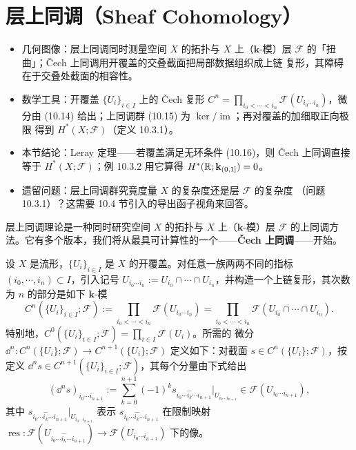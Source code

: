\section{层上同调（Sheaf Cohomology）}

\begin{keytakeaways}
\begin{itemize}
  \item 几何图像：层上同调同时测量空间 $X$ 的拓扑与 $X$ 上（$\mathbf{k}$-模）层
        $\mathcal F$ 的「扭曲」；Čech 上同调用开覆盖的交叠截面把局部数据组织成上链
        复形，其障碍在于交叠处截面的相容性。
  \item 数学工具：开覆盖 $\{U_i\}_{i\in I}$ 上的 Čech 复形
        $C^n=\prod_{i_0<\cdots<i_n}\mathcal F(U_{i_0\cdots i_n})$，微分由 (10.14)
        给出；上同调群 (10.15) 为 $\ker/\operatorname{im}$；再对覆盖的加细取正向极限
        得到 $H^*(X;\mathcal F)$（定义 10.3.1）。
  \item 本节结论：Leray 定理——若覆盖满足无环条件 (10.16)，则 Čech 上同调直接等于
        $H^*(X;\mathcal F)$；例 10.3.2 用它算得 $H^*(\mathbb{R};\mathbf{k}_{(0,1]})=0$。
  \item 遗留问题：层上同调群究竟度量 $X$ 的复杂度还是层 $\mathcal F$ 的复杂度
        （问题 10.3.1）？这需要 10.4 节引入的导出函子视角来回答。
\end{itemize}
\end{keytakeaways}

层上同调理论是一种同时研究空间 $X$ 的拓扑与 $X$ 上（$\mathbf{k}$-模）层
$\mathcal F$ 的上同调方法。它有多个版本，我们将从最具可计算性的一个——\textbf{Čech
上同调}——开始。

设 $X$ 是流形，$\{U_i\}_{i\in I}$ 是 $X$ 的开覆盖。对任意一族两两不同的指标
$(i_0,\cdots,i_n)\subset I$，引入记号
$U_{i_0\cdots i_n}:=U_{i_0}\cap\cdots\cap U_{i_n}$，并构造一个上链复形，其次数为 $n$
的部分是如下 $\mathbf{k}$-模
\begin{equation}\tag{10.13}
C^n(\{U_i\}_{i\in I};\mathcal F):=
\prod_{i_0<\cdots<i_n}\mathcal F(U_{i_0\cdots i_n})
=\prod_{i_0<\cdots<i_n}\mathcal F(U_{i_0}\cap\cdots\cap U_{i_n}).
\end{equation}
特别地，$C^0(\{U_i\}_{i\in I};\mathcal F)=\prod_{i\in I}\mathcal F(U_i)$。所需的
微分 $\dd^n:C^n(\{U_i\};\mathcal F)\to C^{n+1}(\{U_i\};\mathcal F)$ 定义如下：对截面
$s\in C^n(\{U_i\};\mathcal F)$，按定义
$\dd^n s\in C^{n+1}(\{U_i\}_{i\in I};\mathcal F)$，其每个分量由下式给出
\begin{equation}\tag{10.14}
(\dd^n s)_{i_0\cdots i_{n+1}}:=
\sum_{k=0}^{n+1}(-1)^k
s_{i_0\cdots\widehat{i_k}\cdots i_{n+1}}\big|_{U_{i_0\cdots i_{n+1}}}
\in\mathcal F(U_{i_0\cdots i_{n+1}}),
\end{equation}
其中
$s_{i_0\cdots\widehat{i_k}\cdots i_{n+1}}|_{U_{i_0\cdots i_{n+1}}}$ 表示
$s_{i_0\cdots\widehat{i_k}\cdots i_{n+1}}$ 在限制映射
$\operatorname{res}:\mathcal F(U_{i_0\cdots\widehat{i_k}\cdots i_{n+1}})
\to\mathcal F(U_{i_0\cdots i_{n+1}})$ 下的像。

